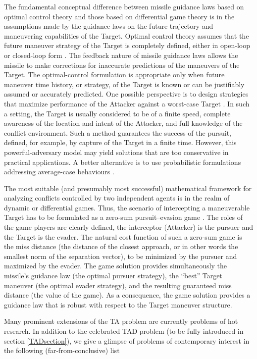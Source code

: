 The fundamental conceptual difference between missile guidance laws based on optimal control theory and those based on differential game theory is in the assumptions made by the guidance laws on the future trajectory and maneuvering capabilities of the Target. Optimal control theory assumes that the future maneuver strategy of the Target is completely defined, either in open-loop or closed-loop form \cite{anderson2012comparison}. The feedback nature of missile guidance laws allows the missile to make corrections for inaccurate predictions of the maneuvers of the Target. The optimal-control formulation is appropriate only when future maneuver time history, or strategy, of the Target is known or can be justifiably assumed or accurately predicted. One possible perspective is to design strategies that maximize performance of the Attacker against a worst-case Target \cite{chung2011search}. In such a setting, the Target is usually considered to be of a finite speed, complete awareness of the location and intent of the Attacker, and full knowledge of the conflict environment. Such a method guarantees the success of the pursuit, defined, for example, by capture of the Target in a finite time. However, this powerful-adversary model may yield solutions that are too conservative in practical applications. A better alternative is to use probabilistic formulations addressing average-case behaviours \cite{chung2011search}. 

The most suitable (and presumably most successful) mathematical framework for analyzing conflicts controlled by two independent agents is in the realm of dynamic or differential games. Thus, the scenario of intercepting a maneuverable Target has to be formulated as a zero-sum pursuit–evasion game \cite{turetsky2003missile}. The roles of the game players are clearly defined, the interceptor (Attacker) is the pursuer and the Target is the evader. The natural cost function of such a zero-sum game is the miss distance (the distance of the closest approach, or in other words the smallest norm of the separation vector), to be minimized by the pursuer and maximized by the evader. The game solution provides simultaneously the missile’s guidance law (the optimal pursuer strategy), the “best” Target maneuver (the optimal evader strategy), and the resulting guaranteed miss distance (the value of the game). As a consequence, the game solution provides a guidance law that is robust with respect to the Target maneuver structure.

Many prominent extensions of the TA problem are currently problems of hot research. In addition to the celebrated TAD problem (to be fully introduced in section \ref{TADsection}), we give a glimpse of problems of contemporary interest in the following (far-from-conclusive) list

